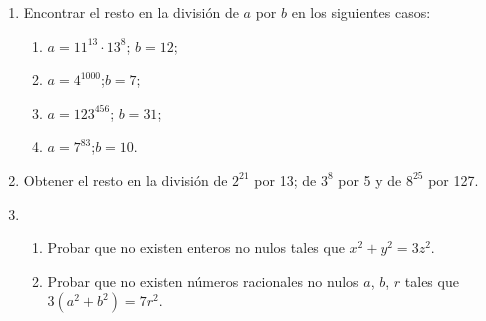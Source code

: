 \documentclass[12pt,spanish,makeidx]{amsbook}
\begin{document}
\begin{enumerate}
\smallskip

\item Encontrar el resto en la divisi\'on de $a$ por $b$ en los siguientes casos:
\begin{multicols}{2}
 \begin{enumerate}
\item $a=11^{13}\cdot 13^8$; \quad $b=12$;
\item $a=4^{1000}$;\quad $b=7$;
\item $a=123^{456}$; \quad  $b=31$;
\item $a=7^{83}$;\quad  $b=10$.
\end{enumerate}
\end{multicols}

\item Obtener el resto en la divisi\'on de $2^{21}$ por 13; de $3^8$ por 5 y de
 $8^{25}$ por 127.









\smallskip
\item \begin{enumerate}
\item Probar que no existen enteros no nulos tales que $x^2 + y^2 = 3z^2$.
\item Probar que no existen n\'umeros racionales no nulos $a$, $b$, $r$ tales que $3(a^2 + b^2) = 7r^2$.
\end{enumerate}

\smallskip



\end{enumerate}
\end{document}
